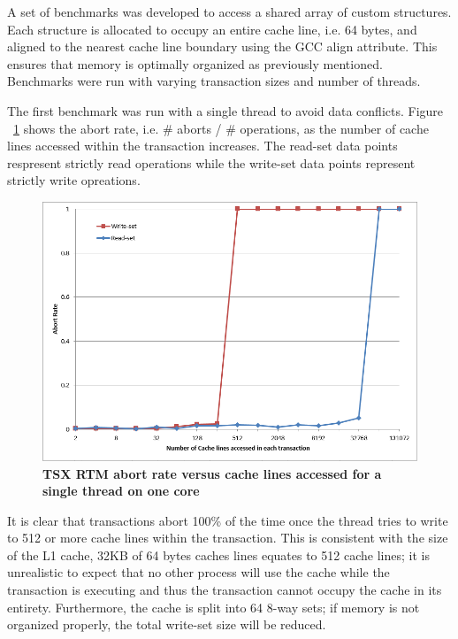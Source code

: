 \documentclass[a4paper]{article}
\begin{document}
\indent
A set of benchmarks was developed to access a shared array of custom structures. Each
structure is allocated to occupy an entire cache line, i.e. 64 bytes, and
aligned to the nearest cache line boundary using the GCC align attribute.  This
ensures that memory is optimally organized as previously mentioned.  Benchmarks
were run with varying transaction sizes and number of threads.
\par

\indent
The first benchmark was run with a single thread to avoid data conflicts.  Figure
~\ref{fig:trx_size} shows the abort rate, i.e. \# aborts / \# operations, as the
number of cache lines accessed within the transaction increases.  The read-set
data points respresent strictly read operations while the write-set data points
represent strictly write opreations.
\par 

\begin{figure}[H]
    \centering
    \graphicspath{ {./figures/} }
    \includegraphics[totalheight=0.50\textheight,keepaspectratio]{trx_size}
    \caption{\textbf{TSX RTM abort rate versus cache lines accessed for a single
    thread on one core}}
    \label{fig:trx_size}
\end{figure}

\indent
It is clear that transactions abort 100\% of the time once the thread tries to
write to 512 or more cache lines within the transaction.  This is consistent
with the size of the L1 cache, 32KB of 64 bytes caches lines equates to 512
cache lines; it is unrealistic to expect that no other process will use the
cache while the transaction is executing and thus the transaction cannot occupy
the cache in its entirety.  Furthermore, the cache is split into 64 8-way sets;
if memory is not organized properly, the total write-set size will be reduced.
\par
\end{document}
